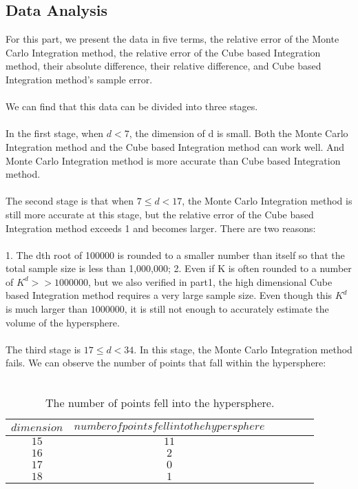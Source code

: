 \documentclass{article}
\begin{document}
		\subsection*{Data Analysis}
		For this part, we present the data in five terms, the relative error of the Monte Carlo Integration method, the relative error of the Cube based Integration method, their absolute difference, their relative difference, and Cube based Integration method’s sample error.
		\\
		\\
		We can find that this data can be divided into three stages. 
		\\
		\\
		In the first stage, when $d < 7$, the dimension of d is small. Both the Monte Carlo Integration method and the Cube based Integration method can work well. And Monte Carlo Integration method is more accurate than Cube based Integration method.
		\\
		\\
		The second stage is that when $7\leq d < 17$, the Monte Carlo Integration method is still more accurate at this stage, but the relative error of the Cube based Integration method exceeds 1 and becomes larger. There are two reasons:
		\\
		\\
		1. The dth root of 100000 is rounded to a smaller number than itself so that the total sample size is less than 1,000,000;
		2. Even if K is often rounded to a number of $K^d>> 1000000$, but we also verified in part1, the high dimensional Cube based Integration method requires a very large sample size. Even though this $K^d$ is much larger than $1000000$, it is still not enough to accurately estimate the volume of the hypersphere.
		\\
		\\
		The third stage is $17\leq d < 34$. In this stage, the Monte Carlo Integration method fails. We can observe the number of points that fall within the hypersphere:
		\\
		\\
		\begin{table}[htbp]
		\centering
		\begin{tabular}{cccccc}  %
			\hline
			$dimension$ &$number of points fell into the hypersphere$\\
			\hline
			$15$ &$11$\\
			$16$ &$2$\\
			$17$ &$0$\\
			$18$ &$1$\\
			\hline
		\end{tabular}
		\caption{The number of points fell into the hypersphere.}
		\label{table:table6}
		\end{table}
\end{document}
